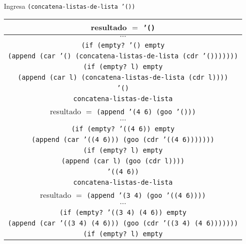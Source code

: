 \documentclass[letterpaper,11pt]{article}
\begin{document}
\begin{enumerate}
\begin{enumerate}
        \newpage
        Ingresa \texttt{(concatena-listas-de-lista '())}
        \begin{center}
            \begin{tabular}{|c|}
                \hline
                resultado $=$ \texttt{'()}  \\
                \hline
                $\cdots$ \\
                \hline
                \texttt{(if (empty? '() empty} \\
                \texttt{(append (car '() 
                (concatena-listas-de-lista (cdr '()))))))} \\
                \hline
                \texttt{(if (empty? l) empty} \\
                \texttt{(append (car l) (concatena-listas-de-lista (cdr l))))} \\
                \hline
                \texttt{'()} \\
                \hline
                \texttt{concatena-listas-de-lista} \\
                \hline
                \hline
                resultado $=$ \texttt{(append '(4 6) (goo '()))}  \\
                \hline
                $\cdots$ \\
                \hline
                \texttt{(if (empty? '((4 6)) empty} \\
                \texttt{(append (car '((4 6))) 
                (goo (cdr '((4 6)))))))} \\
                \hline
                \texttt{(if (empty? l) empty} \\
                \texttt{(append (car l) (goo (cdr l))))} \\
                \hline
                \texttt{'((4 6))} \\
                \hline
                \texttt{concatena-listas-de-lista} \\
                \hline
                \hline
                resultado $=$ \texttt{(append '(3 4) (goo '((4 6))))}  \\
                \hline
                $\cdots$ \\
                \hline
                \texttt{(if (empty? '((3 4) (4 6)) empty} \\
                \texttt{(append (car '((3 4) (4 6))) 
                (goo (cdr '((3 4) (4 6)))))))} \\
                \hline
                \texttt{(if (empty? l) empty} \\

\end{tabular}
\end{center}
\end{enumerate}
\end{enumerate}
\end{document}
